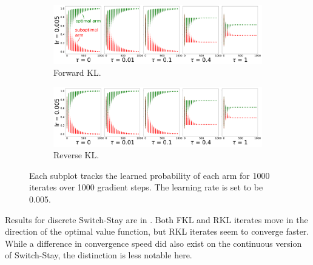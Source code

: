 \documentclass[twoside,11pt]{article}
\begin{document}

\begin{figure}[!htb]
  \centering
  \begin{subfigure}[b]{1\linewidth}
    \centering
    \includegraphics[width=1\columnwidth]{figs/discrete-bandit/notlearnQ/rmsprop/prob_forward_optim=rmsprop_lr=0.005.png}
    \caption{Forward KL.}
    \label{fig:discrete-bandit-prob-forward-rmsprop}
  \end{subfigure}%
  
  \begin{subfigure}[b]{1\linewidth}
    \centering
    \includegraphics[width=1\columnwidth]{figs/discrete-bandit/notlearnQ/rmsprop/prob_reverse_optim=rmsprop_lr=0.005.png}
    \caption{Reverse KL. }
    \label{fig:discrete-bandit-prob-reverse-rmsprop}
  \end{subfigure}
  \caption{Each subplot tracks the learned probability of each arm for 1000 iterates over 1000 gradient steps. The learning rate is set to be 0.005. }
\end{figure}


Results for discrete Switch-Stay are in . Both FKL and RKL iterates move in the direction of the optimal value function, but RKL iterates seem to converge faster. While a difference in convergence speed did also exist on the continuous version of Switch-Stay, the distinction is less notable here. 
\end{document}
